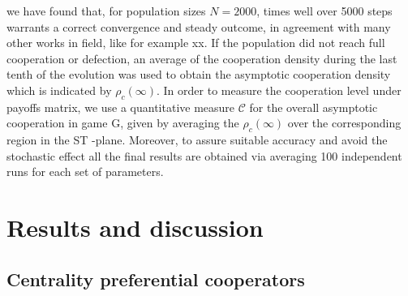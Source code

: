 \documentclass[preprint,12pt,3p]{elsarticle}
\begin{document}
we have found that, for population sizes $N=2000$, times well over 5000 steps
warrants a correct convergence and steady outcome, in agreement with many other works in field, like for example xx.
If the population did not reach full cooperation or defection,
an average of the cooperation density during the last tenth of the evolution was used to obtain
the asymptotic cooperation density which is indicated by $\rho_{c}(\infty)$.
In order to measure the cooperation level under payoffs matrix, we use a quantitative measure  $\mathcal{C}$
for the overall asymptotic cooperation in game G, given by averaging the $\rho_{c}(\infty)$
over the corresponding region in the ST -plane.
Moreover, to assure suitable accuracy and avoid the stochastic effect all the final results are obtained
via averaging 100 independent runs for each set of parameters.

\section{ Results and discussion}

\subsection{Centrality preferential cooperators}
\end{document}
